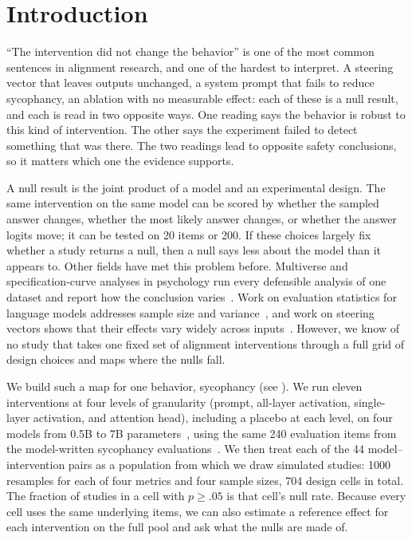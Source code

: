 \section{Introduction}
\label{sec:intro}

``The intervention did not change the behavior'' is one of the most common sentences in alignment research, and one of the hardest to interpret.
A steering vector that leaves outputs unchanged, a system prompt that fails to reduce sycophancy, an ablation with no measurable effect: each of these is a null result, and each is read in two opposite ways.
One reading says the behavior is robust to this kind of intervention.
The other says the experiment failed to detect something that was there.
The two readings lead to opposite safety conclusions, so it matters which one the evidence supports.

A null result is the joint product of a model and an experimental design.
The same intervention on the same model can be scored by whether the sampled answer changes, whether the most likely answer changes, or whether the answer logits move; it can be tested on 20 items or 200.
If these choices largely fix whether a study returns a null, then a null says less about the model than it appears to.
Other fields have met this problem before.
Multiverse and specification-curve analyses in psychology run every defensible analysis of one dataset and report how the conclusion varies~\cite{steegen2016increasing,simonsohn2020specification}.
Work on evaluation statistics for language models addresses sample size and variance~\cite{miller2024adding,card2020little}, and work on steering vectors shows that their effects vary widely across inputs~\cite{tan2024analyzing}.
However, we know of no study that takes one fixed set of alignment interventions through a full grid of design choices and maps where the nulls fall.

We build such a map for one behavior, sycophancy (see ).
We run eleven interventions at four levels of granularity (prompt, all-layer activation, single-layer activation, and attention head), including a placebo at each level, on four \qwen models from 0.5B to 7B parameters~\cite{qwen2024qwen25}, using the same 240 evaluation items from the model-written sycophancy evaluations~\cite{perez2022discovering}.
We then treat each of the 44 model--intervention pairs as a population from which we draw simulated studies: 1000 resamples for each of four metrics and four sample sizes, 704 design cells in total.
The fraction of studies in a cell with $p \ge .05$ is that cell's null rate.
Because every cell uses the same underlying items, we can also estimate a reference effect for each intervention on the full pool and ask what the nulls are made of.

